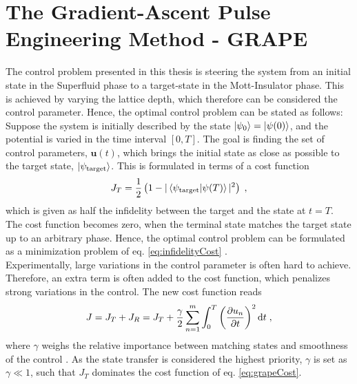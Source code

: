 \section{The Gradient-Ascent Pulse Engineering Method - GRAPE} \label{sec:GRAPE}
The control problem presented in this thesis is steering the system from an initial state in the Superfluid phase to a target-state in the Mott-Insulator phase. This is achieved by varying the lattice depth, which therefore can be considered the control parameter. Hence, the optimal control problem can be stated as follows: 
Suppose the system is initially described by the state $\ket{\psi_0} = \ket{\psi (0)}$, and the potential is varied in the time interval $[ 0 , T]$. The goal is finding the set of control parameters, $\boldsymbol{u}(t)$, which brings the initial state as close as possible to the target state, $\ket{\psi_{\mathrm{target}}}$. This is formulated in terms of a cost function
\begin{equation}
	J_T = \frac{1}{2} \left( 1-|\braket{\psi_{\mathrm{target}} | \psi (T)}|^2 \right) \; ,
	\label{eq:infidelityCost}
\end{equation}
which is given as half the infidelity between the target and the state at $t=T$. The cost function becomes zero, when the terminal state matches the target state up to an arbitrary phase. Hence, the optimal control problem can be formulated as a minimization problem of eq. \eqref{eq:infidelityCost} \cite{Jager2014}.\\
Experimentally, large variations in the control parameter is often hard to achieve. Therefore, an extra term is often added to the cost function, which penalizes strong variations in the control. The new cost function reads
\begin{equation}
	J = J_T + J_R = J_T + \frac{\gamma}{2} \sum_{n=1}^{m} \int_{0}^{T} \left( \pdv{u_n}{t} \right)^2 \mathrm{d}t \; ,
	\label{eq:grapeCost}
\end{equation}
where $\gamma$ weighs the relative importance between matching states and smoothness of the control \cite{Jager2014}. As the state transfer is considered the highest priority, $\gamma$ is set as $\gamma \ll 1$, such that $J_T$ dominates the cost function of eq. \eqref{eq:grapeCost}.\\


